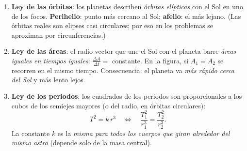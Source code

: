 \documentclass[11pt,a4paper]{article}
\begin{document}
\begin{center}
\end{center}

\begin{enumerate}[itemsep=4pt]
  \item \textbf{Ley de las órbitas}: los planetas describen \emph{órbitas elípticas} con el Sol en uno de los focos. \textbf{Perihelio}: punto más cercano al Sol; \textbf{afelio}: el más lejano. (Las órbitas reales son elipses casi circulares; por eso en los problemas se aproximan por circunferencias.)
  \item \textbf{Ley de las áreas}: el radio vector que une el Sol con el planeta barre \emph{áreas iguales en tiempos iguales}: $\frac{\Delta A}{\Delta t}=$ constante. En la figura, si $A_1=A_2$ se recorren en el mismo tiempo. Consecuencia: el planeta va \emph{más rápido cerca del Sol} y más lento lejos.
  \item \textbf{Ley de los periodos}: los cuadrados de los periodos son proporcionales a los cubos de los semiejes mayores (o del radio, en órbitas circulares):
  \[ T^2=k\,r^3\quad\Longleftrightarrow\quad\frac{T_1^2}{r_1^3}=\frac{T_2^2}{r_2^3}. \]
  La constante $k$ es la \emph{misma para todos los cuerpos que giran alrededor del mismo astro} (depende solo de la masa central).
\end{enumerate}
\end{document}
